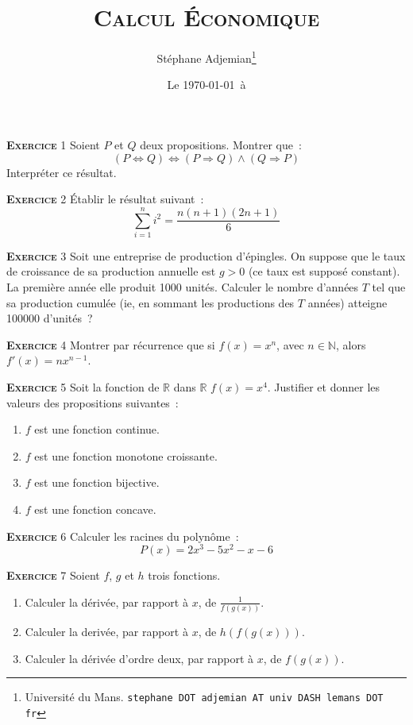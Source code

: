 \documentclass[10pt,a4paper,notitlepage]{article}
\newcommand{\exercice}[1]{\textsc{\textbf{Exercice}} #1}
\begin{document}
\title{\textsc{Calcul Économique}}
\author{Stéphane Adjemian\thanks{Université du Mans. \texttt{stephane DOT adjemian AT univ DASH lemans DOT fr}}}
\date{Le \today\ à \thistime}

\maketitle

\exercice{1} Soient $P$ et $Q$ deux propositions. Montrer  que :
\[
(P \Leftrightarrow Q) \Leftrightarrow (P \Rightarrow Q) \land (Q
\Rightarrow P)
\]
Interpréter ce résultat.

\bigskip

\exercice{2} Établir le résultat suivant :
\[
\sum_{i=1}^n i^2 = \frac{n(n+1)(2n+1)}{6} 
\]

\bigskip

\exercice{3} Soit une entreprise de production d'épingles. On suppose
que le taux de croissance de sa production annuelle est $g>0$ (ce taux
est supposé constant). La première année elle produit 1000
unités. Calculer le nombre d'années $T$ tel que sa production
cumulée (ie, en sommant les productions des $T$ années) atteigne
100000 d'unités ?

\bigskip

\exercice{4} Montrer par récurrence que si $f(x) = x^n$, avec $n\in\mathbb N$, alors 
$f'(x) = nx^{n-1}$.

\bigskip

\exercice{5} Soit la fonction de $\mathbb R$ dans $\mathbb R$ $f(x) =
x^4$. Justifier et donner les valeurs des propositions suivantes :
\begin{enumerate}
\item $f$ est une fonction continue.
\item $f$ est une fonction monotone croissante.
\item $f$ est une fonction bijective.
\item $f$ est une fonction concave.
\end{enumerate}

\bigskip

\exercice{6} Calculer les racines du polynôme :
\[
P(x) = 2x^3 - 5x^2 - x - 6
\]    

\exercice{7} Soient $f$, $g$ et $h$ trois fonctions.
\begin{enumerate}
\item Calculer la dérivée, par rapport à $x$, de $\frac{1}{f(g(x))}$.
\item Calculer la derivée, par rapport à $x$, de $h(f(g(x)))$.
\item Calculer la dérivée d'ordre deux, par rapport à $x$, de $f(g(x))$.  
\end{enumerate}
\end{document}

